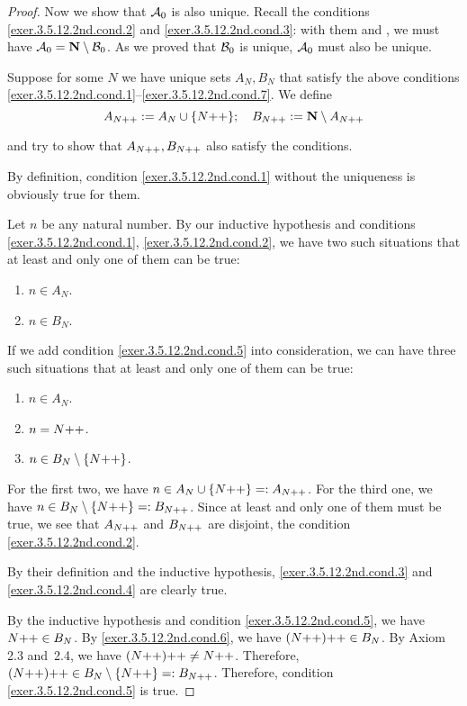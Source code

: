 \begin{proof}
	Now we show that ${\cal A}_0$ is also unique. Recall the conditions \ref{exer.3.5.12.2nd.cond.2} and \ref{exer.3.5.12.2nd.cond.3}: with them and , we must have ${\cal A}_0 = \mathbf{N} \setminus {\cal B}_0$. As we proved that ${\cal B}_0$ is unique, ${\cal A}_0$ must also be unique.
	\endgroup
	
	\myisbox Suppose for some $N$ we have unique sets $A_N,B_N$ that satisfy the above conditions \ref{exer.3.5.12.2nd.cond.1}--\ref{exer.3.5.12.2nd.cond.7}. We define
	\begin{equation}
		A_{N{+}{+}} := A_N \cup \{N{+}{+}\}; \quad B_{N{+}{+}} := \mathbf{N} \setminus A_{N{+}{+}} \label{eq.3.5.12.relation.an.bn}
	\end{equation}
	
	and try to show that $A_{N{+}{+}},B_{N{+}{+}}$ also satisfy the conditions.
	
	By definition, condition \ref{exer.3.5.12.2nd.cond.1} without the uniqueness is obviously true for them.
	
	Let $n$ be any natural number. By our inductive hypothesis and conditions \ref{exer.3.5.12.2nd.cond.1}, \ref{exer.3.5.12.2nd.cond.2}, we have two such situations that at least and only one of them can be true:
	\begin{enumerate}
		\item $n \in A_N$.
		\item $n \in B_N$.
	\end{enumerate}
	If we add condition \ref{exer.3.5.12.2nd.cond.5} into consideration, we can have three such situations that at least and only one of them can be true:
	\begin{enumerate}
		\item $n \in A_N$.
		\item $n = N{+}{+}$.
		\item $n \in B_N \setminus \{N{+}{+}\}$.
	\end{enumerate}
	For the first two, we have $n \in A_N \cup \{N{+}{+}\} =: A_{N{+}{+}}$. For the third one, we have $n \in B_N \setminus \{N{+}{+}\} =: B_{N{+}{+}}$. Since at least and only one of them must be true, we see that $A_{N{+}{+}}$ and $B_{N{+}{+}}$ are disjoint, the condition \ref{exer.3.5.12.2nd.cond.2}.
	
	By their definition and the inductive hypothesis, \ref{exer.3.5.12.2nd.cond.3} and \ref{exer.3.5.12.2nd.cond.4} are clearly true.
	
	By the inductive hypothesis and condition \ref{exer.3.5.12.2nd.cond.5}, we have $N{+}{+} \in B_N$. By \ref{exer.3.5.12.2nd.cond.6}, we have $(N{+}{+}){+}{+} \in B_N$. By Axiom 2.3 and~2.4, we have $(N{+}{+}){+}{+} \ne N{+}{+}$. Therefore, $(N{+}{+}){+}{+} \in B_N \setminus \{N{+}{+}\} =: B_{N{+}{+}}$. Therefore, condition \ref{exer.3.5.12.2nd.cond.5} is true.
	

\end{proof}
